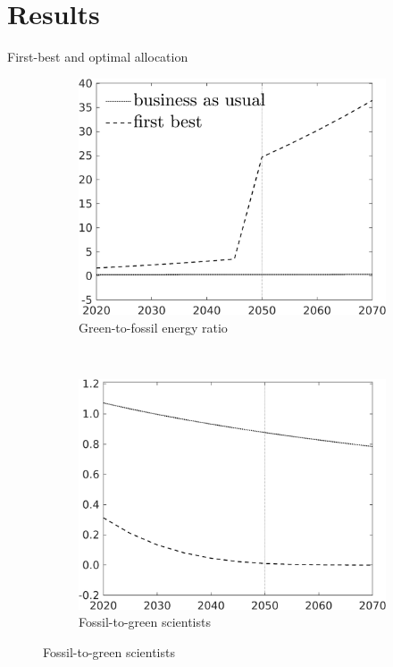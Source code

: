 \documentclass[11pt,aspectratio=169]{beamer}
\begin{document}
\hypertarget{resback}{}
\section{Results}


\begin{frame}{First-best and optimal allocation}
	\pause
	\begin{figure}[h!!]
		\centering
		\begin{subfigure}{0.45\textwidth}		
			\caption{{Green-to-fossil energy ratio}}
			\includegraphics[width=1\textwidth]{../codding_model/own_basedOnFried/optimalPol_010922_revision/figures/all_13Sept22/NewCalib_effBAU_T_GFF_Sun2_emnet1_spillover0_knspil3_xgr0_nsk0_sep0_extern0_PV1_etaa0.79_lgd1.png}
		\end{subfigure}
		\begin{minipage}[]{0.05\textwidth}
			\
		\end{minipage}
		\begin{subfigure}{0.45\textwidth}		
			\caption{{Fossil-to-green scientists}}
			\includegraphics[width=1\textwidth]{../codding_model/own_basedOnFried/optimalPol_010922_revision/figures/all_13Sept22/NewCalib_effBAU_T_sffsg_Sun2_emnet1_spillover0_knspil3_xgr0_nsk0_sep0_extern0_PV1_etaa0.79_lgd0.png}

\end{subfigure}
\end{figure}
\end{frame}
\end{document}
